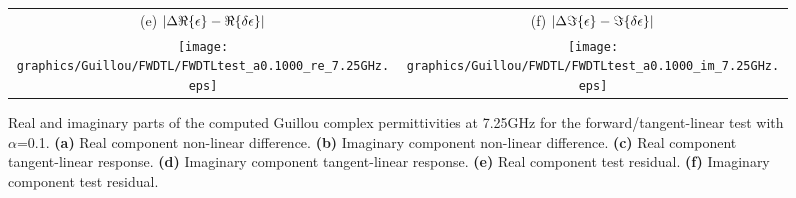\begin{figure}[htp]
\begin{tabular}{c c}
    \textsf{(e)} $|\Delta\Re\{\epsilon\} - \Re\{\delta\epsilon\}|$ &
    \textsf{(f)} $|\Delta\Im\{\epsilon\} - \Im\{\delta\epsilon\}|$ \\
    \texttt{[image: graphics/Guillou/FWDTL/FWDTLtest\_a0.1000\_re\_7.25GHz.eps]} & 
    \texttt{[image: graphics/Guillou/FWDTL/FWDTLtest\_a0.1000\_im\_7.25GHz.eps]}
  \end{tabular}
  \caption{Real and imaginary parts of the computed Guillou complex permittivities at 7.25GHz for the forward/tangent-linear test with $\alpha$=0.1. \textbf{(a)} Real component non-linear difference.  \textbf{(b)} Imaginary component non-linear difference. \textbf{(c)} Real component tangent-linear response. \textbf{(d)} Imaginary component tangent-linear response. \textbf{(e)} Real component test residual. \textbf{(f)} Imaginary component test residual.}
  \label{fig:fwdtl_a0.1000_guillou}
\end{figure}

